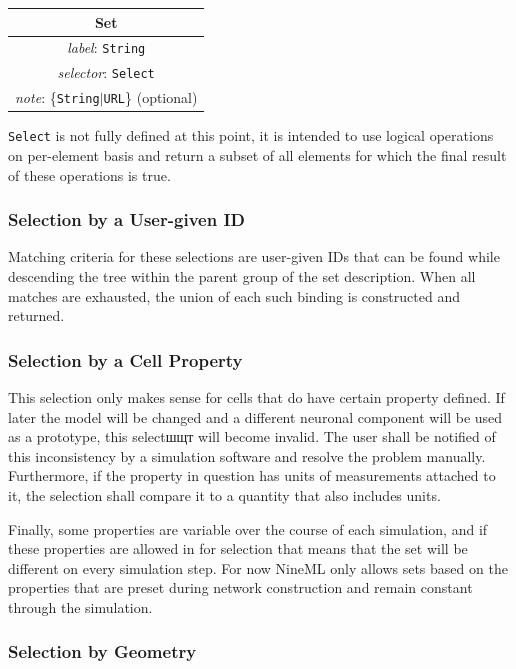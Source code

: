 \documentclass{article}
\begin{document}
\begin{table}[htb]
\center
\begin{tabular}{|c|}
\hline
\hline
Set \\
\hline
\hline
{\em label}: {\tt String} \\
\hline
{\em selector}: {\tt Select} \\
\hline
{\em note}: \{{\tt String}$|${\tt URL}\} (optional)\\
\hline
\end{tabular}
\end{table}

{\tt Select} is not fully defined at this point, it is intended to use
logical operations on per-element basis and return a subset of all
elements for which the final result of these operations is true.

\subsubsection{Selection by a User-given ID}

Matching criteria for these selections are user-given IDs that can be found
while descending the tree within the parent group of the set description.
When all matches are exhausted, the union of each such binding is
constructed and returned.

\subsubsection{Selection by a Cell Property}

This selection only makes sense for cells that do have certain property
defined. If later the model will be changed and a different
neuronal component will be used as a prototype, this selectшщт will become
invalid. The user shall be notified of this inconsistency by a simulation
software and resolve the problem manually. Furthermore, if the property
in question has units of measurements attached to it, the selection shall
compare it to a quantity that also includes units.

Finally, some properties are variable over
the course of each simulation, and if these properties are allowed in for
selection that means that the set will be different on every simulation
step. For now NineML only allows sets based on the properties that are
preset during network construction and remain constant through the
simulation.

\subsubsection{Selection by Geometry}
\end{document}
